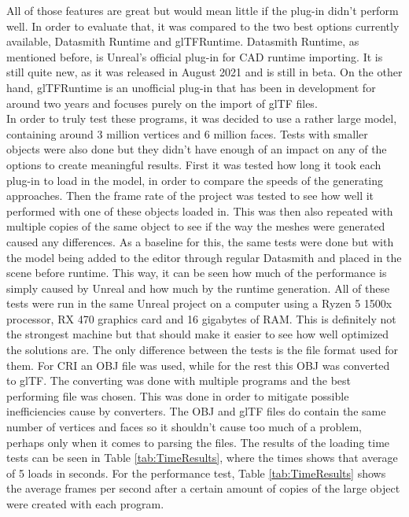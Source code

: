 All of those features are great but would mean little if the plug-in didn't perform well. In order to evaluate that, it was compared to the two best options currently available, Datasmith Runtime and glTFRuntime. Datasmith Runtime, as mentioned before, is Unreal's official plug-in for CAD runtime importing. It is still quite new, as it was released in August 2021 and is still in beta\cite{bib:DSRunDoc}. On the other hand, glTFRuntime is an unofficial plug-in that has been in development for around two years and focuses purely on the import of glTF files\cite{bib:glTFRun}.\\
In order to truly test these programs, it was decided to use a rather large model, containing around 3 million vertices and 6 million faces. Tests with smaller objects were also done but they didn't have enough of an impact on any of the options to create meaningful results. First it was tested how long it took each plug-in to load in the model, in order to compare the speeds of the generating approaches. Then the frame rate of the project was tested to see how well it performed with one of these objects loaded in. This was then also repeated with multiple copies of the same object to see if the way the meshes were generated caused any differences. As a baseline for this, the same tests were done but with the model being added to the editor through regular Datasmith and placed in the scene before runtime. This way, it can be seen how much of the performance is simply caused by Unreal and how much by the runtime generation. All of these tests were run in the same Unreal project on a computer using a Ryzen 5 1500x processor, RX 470 graphics card and 16 gigabytes of RAM. This is definitely not the strongest machine but that should make it easier to see how well optimized the solutions are. The only difference between the tests is the file format used for them. For \acs{CRI} an OBJ file was used, while for the rest this OBJ was converted to glTF. The converting was done with multiple programs and the best performing file was chosen. This was done in order to mitigate possible inefficiencies cause by converters. The OBJ and glTF files do contain the same number of vertices and faces so it shouldn't cause too much of a problem, perhaps only when it comes to parsing the files. The results of the loading time tests can be seen in Table \ref{tab:TimeResults}, where the times shows that average of 5 loads in seconds. For the performance test, Table \ref{tab:TimeResults} shows the average frames per second after a certain amount of copies of the large object were created with each program.\\


